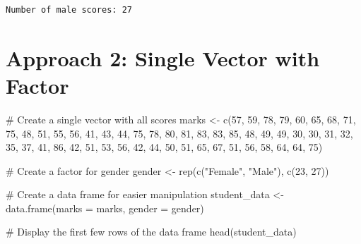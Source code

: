 \documentclass[
  letterpaper,
  DIV=11,
  numbers=noendperiod]{scrartcl}
\newenvironment{Shaded}{\begin{snugshade}}{\end{snugshade}}
\newcommand{\AttributeTok}[1]{\textcolor[rgb]{0.40,0.45,0.13}{#1}}
\newcommand{\CommentTok}[1]{\textcolor[rgb]{0.37,0.37,0.37}{#1}}
\newcommand{\DecValTok}[1]{\textcolor[rgb]{0.68,0.00,0.00}{#1}}
\newcommand{\FunctionTok}[1]{\textcolor[rgb]{0.28,0.35,0.67}{#1}}
\newcommand{\NormalTok}[1]{\textcolor[rgb]{0.00,0.23,0.31}{#1}}
\newcommand{\OtherTok}[1]{\textcolor[rgb]{0.00,0.23,0.31}{#1}}
\newcommand{\StringTok}[1]{\textcolor[rgb]{0.13,0.47,0.30}{#1}}
\begin{document}
\begin{verbatim}
Number of male scores: 27 
\end{verbatim}

\section{Approach 2: Single Vector with
Factor}\label{approach-2-single-vector-with-factor}

\begin{Shaded}
\begin{Highlighting}[]
\CommentTok{\# Create a single vector with all scores}
\NormalTok{marks }\OtherTok{\textless{}{-}} \FunctionTok{c}\NormalTok{(}\DecValTok{57}\NormalTok{, }\DecValTok{59}\NormalTok{, }\DecValTok{78}\NormalTok{, }\DecValTok{79}\NormalTok{, }\DecValTok{60}\NormalTok{, }\DecValTok{65}\NormalTok{, }\DecValTok{68}\NormalTok{, }\DecValTok{71}\NormalTok{, }\DecValTok{75}\NormalTok{, }\DecValTok{48}\NormalTok{, }\DecValTok{51}\NormalTok{, }\DecValTok{55}\NormalTok{, }\DecValTok{56}\NormalTok{, }\DecValTok{41}\NormalTok{, }\DecValTok{43}\NormalTok{, }\DecValTok{44}\NormalTok{, }\DecValTok{75}\NormalTok{, }\DecValTok{78}\NormalTok{, }
           \DecValTok{80}\NormalTok{, }\DecValTok{81}\NormalTok{, }\DecValTok{83}\NormalTok{, }\DecValTok{83}\NormalTok{, }\DecValTok{85}\NormalTok{, }\DecValTok{48}\NormalTok{, }\DecValTok{49}\NormalTok{, }\DecValTok{49}\NormalTok{, }\DecValTok{30}\NormalTok{, }\DecValTok{30}\NormalTok{, }\DecValTok{31}\NormalTok{, }\DecValTok{32}\NormalTok{, }\DecValTok{35}\NormalTok{, }\DecValTok{37}\NormalTok{, }\DecValTok{41}\NormalTok{, }\DecValTok{86}\NormalTok{, }\DecValTok{42}\NormalTok{, }\DecValTok{51}\NormalTok{, }
           \DecValTok{53}\NormalTok{, }\DecValTok{56}\NormalTok{, }\DecValTok{42}\NormalTok{, }\DecValTok{44}\NormalTok{, }\DecValTok{50}\NormalTok{, }\DecValTok{51}\NormalTok{, }\DecValTok{65}\NormalTok{, }\DecValTok{67}\NormalTok{, }\DecValTok{51}\NormalTok{, }\DecValTok{56}\NormalTok{, }\DecValTok{58}\NormalTok{, }\DecValTok{64}\NormalTok{, }\DecValTok{64}\NormalTok{, }\DecValTok{75}\NormalTok{)}

\CommentTok{\# Create a factor for gender}
\NormalTok{gender }\OtherTok{\textless{}{-}} \FunctionTok{rep}\NormalTok{(}\FunctionTok{c}\NormalTok{(}\StringTok{"Female"}\NormalTok{, }\StringTok{"Male"}\NormalTok{), }\FunctionTok{c}\NormalTok{(}\DecValTok{23}\NormalTok{, }\DecValTok{27}\NormalTok{))}

\CommentTok{\# Create a data frame for easier manipulation}
\NormalTok{student\_data }\OtherTok{\textless{}{-}} \FunctionTok{data.frame}\NormalTok{(}\AttributeTok{marks =}\NormalTok{ marks, }\AttributeTok{gender =}\NormalTok{ gender)}

\CommentTok{\# Display the first few rows of the data frame}
\FunctionTok{head}\NormalTok{(student\_data)}
\end{Highlighting}
\end{Shaded}
\end{document}
